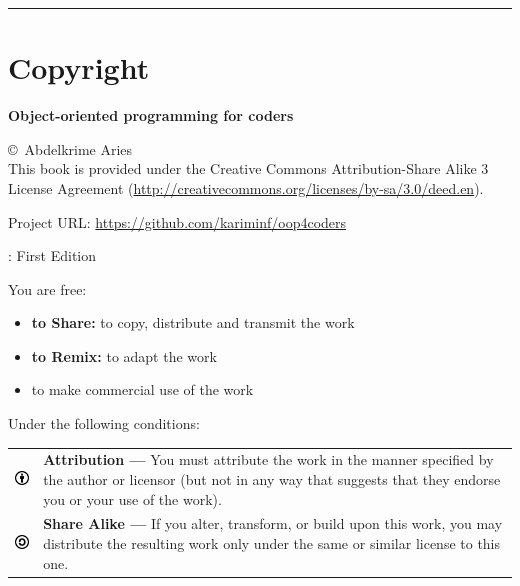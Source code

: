 \documentclass[12pt]{book}
\begin{document}
\fi

\newpage
\hrule
\chapter*{Copyright}
\begin{flushright}
{\Huge \textbf{Object-oriented programming for coders}}
\end{flushright}

  \copyright\ Abdelkrime Aries \\[0.5cm]
This book is provided under the Creative Commons Attribution-Share Alike 3 License Agreement (\url{http://creativecommons.org/licenses/by-sa/3.0/deed.en}).

\vspace{0.5cm}
\noindent
Project URL: \url{https://github.com/kariminf/oop4coders}

\vspace{1cm}
: \hspace{2cm} First Edition

\tiny
\vspace{1cm}
\noindent
You are free:
\begin{itemize}
\item \textbf{to Share:} to copy, distribute and transmit the work
\item \textbf{to Remix:} to adapt the work
\item to make commercial use of the work
\end{itemize}

\vspace{1cm}
\noindent
Under the following conditions:\\
\begin{tabular}{m{}m{}}
\includegraphics[width=1cm]{img/by.png} & 
\textbf{Attribution —} You must attribute the work in the manner specified by the author or licensor (but not in any way that suggests that they endorse you or your use of the work). \\
\includegraphics[width=1cm]{img/sa.png} &
\textbf{Share Alike —} If you alter, transform, or build upon this work, you may distribute the resulting work only under the same or similar license to this one.
\end{tabular}
\end{document}
